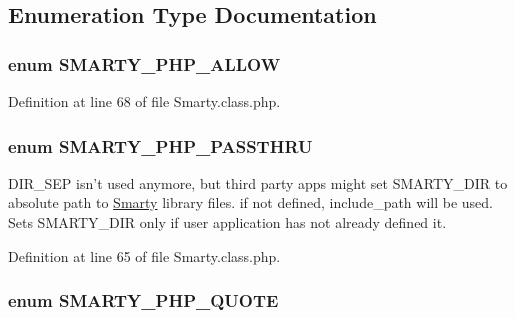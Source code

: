 \subsection{\-Enumeration \-Type \-Documentation}
\hypertarget{_smarty_8class_8php_a1c2937c2d2161c312c415cae094b300d}{
\subsubsection[{\-S\-M\-A\-R\-T\-Y\-\_\-\-P\-H\-P\-\_\-\-A\-L\-L\-O\-W}]{\setlength{\rightskip}{0pt plus 5cm}enum {\bf \-S\-M\-A\-R\-T\-Y\-\_\-\-P\-H\-P\-\_\-\-A\-L\-L\-O\-W}}}\label{_smarty_8class_8php_a1c2937c2d2161c312c415cae094b300d}


\-Definition at line 68 of file \-Smarty.\-class.\-php.

\hypertarget{_smarty_8class_8php_ae3b4c1abf166f5bc090b8ffd8b7b986e}{
\subsubsection[{\-S\-M\-A\-R\-T\-Y\-\_\-\-P\-H\-P\-\_\-\-P\-A\-S\-S\-T\-H\-R\-U}]{\setlength{\rightskip}{0pt plus 5cm}enum {\bf \-S\-M\-A\-R\-T\-Y\-\_\-\-P\-H\-P\-\_\-\-P\-A\-S\-S\-T\-H\-R\-U}}}\label{_smarty_8class_8php_ae3b4c1abf166f5bc090b8ffd8b7b986e}
\-D\-I\-R\-\_\-\-S\-E\-P isn't used anymore, but third party apps might set \-S\-M\-A\-R\-T\-Y\-\_\-\-D\-I\-R to absolute path to \hyperlink{class_smarty}{\-Smarty} library files. if not defined, include\-\_\-path will be used. \-Sets \-S\-M\-A\-R\-T\-Y\-\_\-\-D\-I\-R only if user application has not already defined it. 

\-Definition at line 65 of file \-Smarty.\-class.\-php.

\hypertarget{_smarty_8class_8php_a44cc0679267a6e4f6cf041fdee4fd20f}{
\subsubsection[{\-S\-M\-A\-R\-T\-Y\-\_\-\-P\-H\-P\-\_\-\-Q\-U\-O\-T\-E}]{\setlength{\rightskip}{0pt plus 5cm}enum {\bf \-S\-M\-A\-R\-T\-Y\-\_\-\-P\-H\-P\-\_\-\-Q\-U\-O\-T\-E}}}\label{_smarty_8class_8php_a44cc0679267a6e4f6cf041fdee4fd20f}


